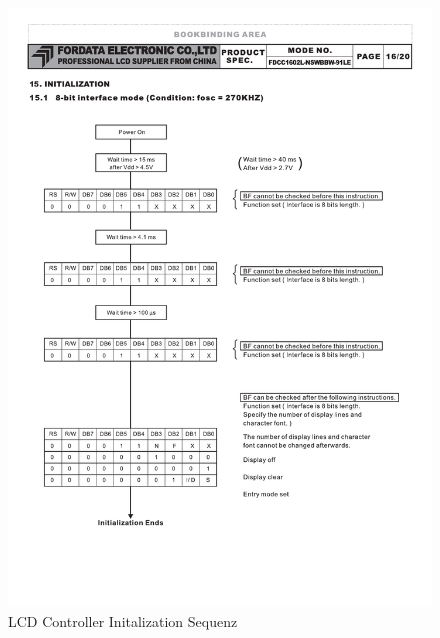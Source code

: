\begin{figure}[!h]
	\centering
	\includegraphics[width=\textwidth]{Images/InitalizationLCD8Bit}
	\caption{LCD Controller Initalization Sequenz}
	\label{image:lcdinit}
\end{figure}


